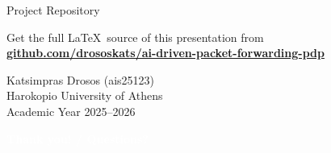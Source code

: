 {
\begin{frame}{Project Repository}
  \begin{center}

    Get the full \LaTeX\ source of this presentation from\\[8pt]

    {\color{HUAblue}\bfseries
      \href{https://github.com/drososkats/ai-driven-packet-forwarding-pdp}
           {github.com/drososkats/ai-driven-packet-forwarding-pdp}}

    \vspace{8pt}

    \ccbysa

    \vspace{8pt}

    {\footnotesize
      Katsimpras Drosos (ais25123)\\
      Harokopio University of Athens\\
      Academic Year 2025--2026}

  \end{center}
\end{frame}
}

{
\begin{frame}
    \textcolor{white}{\textbf{Thank you! / Questions?}}
   ~\alert{\faSmile}~
\end{frame}
}

